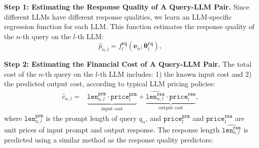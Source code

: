 \noindent\textbf{Step 1: Estimating the Response Quality of A Query-LLM Pair.} 
Since different LLMs have different response qualities, we learn an LLM-specific regression function for each LLM. This function estimates the response quality of the $n$-th query on the $l$-th LLM:
\begin{equation}
    \hat{p}_{n,l} = f_l^\texttt{rq}(\mathbf{e}_n; \boldsymbol{\theta}_l^\texttt{rq}),
\end{equation}

\iffalse
We define a set of LLM-specific predictive functions $F^P = \{f_1^P, f_2^P, \ldots, f_L^P\}$ to predict the response quality:
\begin{equation}
    \hat{p}_{n,l} = f_l^P(\mathbf{e}_n; \boldsymbol{\theta}_l^P),
\end{equation}
where $f_l^P$ predicts the expected response quality of $\texttt{LLM}_l$ for query $q_n$ parameterized by $\boldsymbol{\theta}_l^P$. These models are trained using historical data. Moreover, training-free models may also work, such as scaling laws~\cite{ruan2024observational}.
\fi

\noindent\textbf{Step 2: Estimating the Financial Cost of A Query-LLM Pair.} 
The total cost of the $n$-th query on the $l$-th LLM includes: 
1) the known input cost and 2) the predicted output cost, according to typical LLM pricing policies:
\begin{equation}
    \begin{aligned}
    \hat{c}_{n,l} = &\underbrace{\texttt{len}_{n,l}^{\texttt{prm}} \cdot \texttt{price}_l^{\texttt{prm}}}_{\text{input cost}} + \underbrace{\hat{\texttt{len}_{n,l}^{\texttt{res}}} \cdot \texttt{price}_l^{\texttt{res}}}_{\text{output cost}},
    \end{aligned}
\end{equation}
where $\texttt{len}_{n,l}^{\texttt{prm}}$ is the prompt length of query $q_n$, and $\texttt{price}_l^{\texttt{prm}}$ and $\texttt{price}_l^{\texttt{res}}$ are unit prices of input prompt and output response.
The response length $\hat{\texttt{len}_{n,l}^{\texttt{res}}}$ is predicted using a similar method as the response quality predictors:

